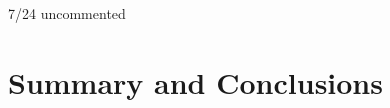 \documentclass{dune}
\begin{document}
%




\cleardoublepage

%
\cleardoublepage

 7/24 uncommented

\cleardoublepage


\cleardoublepage


\cleardoublepage


\cleardoublepage


\cleardoublepage


\cleardoublepage


\cleardoublepage

%

%

\chapter{Summary and Conclusions}
%
\cleardoublepage

%


\cleardoublepage



\end{document}
